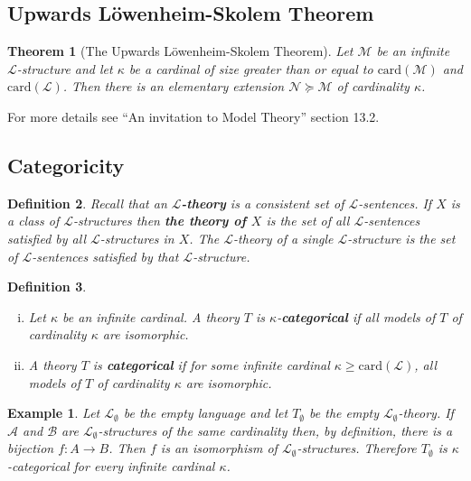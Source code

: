 \documentclass[11pt]{article}
\newtheorem{theorem}{Theorem}[section]
\newtheorem*{example*}{Example}
\newtheorem{definition}[theorem]{Definition}
\newcommand{\mcal}[1]{\mathcal{#1}}
\begin{document}
\subsection{Upwards L\"owenheim-Skolem Theorem}

\begin{theorem}[The Upwards L\"owenheim-Skolem Theorem]
Let $\mcal{M} $ be an infinite $\mcal{L}$-structure and let $\kappa$ be a cardinal of size greater than or equal to $\textrm{card}(\mcal{M})$ and $\textrm{card}(\mcal{L})$.
Then there is an elementary extension $\mcal{N}\succeq \mcal{M}$ of cardinality $\kappa$.
\end{theorem}


For more details see ``An invitation to Model Theory'' section 13.2.

\subsection{Categoricity}

\begin{definition}
Recall that an \textbf{$\mcal{L}$-theory} is a consistent set of $\mcal{L}$-sentences. If $X$ is a class of $\mcal{L}$-structures then \textbf{the theory of $X$} is the set of all $\mcal{L}$-sentences satisfied by all $\mcal{L}$-structures in $X$. The $\mcal{L}$-theory of a single $\mcal{L}$-structure is the set of $\mcal{L}$-sentences satisfied by that $\mcal{L}$-structure.
\end{definition}

\begin{definition}
\begin{enumerate}[(i)]
\item
Let $\kappa$ be an infinite cardinal. A theory $T$ is $\kappa$-\textbf{categorical} if all models of $T$ of cardinality $\kappa$ are isomorphic.
\item
A theory $T$ is \textbf{categorical} if for some infinite cardinal $\kappa\geq \textrm{card}(\mcal{L})$, all models of $T$ of cardinality $\kappa$ are isomorphic.
\end{enumerate}
\end{definition}

\begin{example*}
Let $\mcal{L}_\emptyset$ be the empty language and let $T_\emptyset$ be the empty $\mcal{L}_\emptyset$-theory. If $\mcal{A}$ and $\mcal{B}$ are $\mcal{L}_\emptyset$-structures of the same cardinality then, by definition, there is a bijection $f:A\rightarrow B$. Then $f$ is an isomorphism of $\mcal{L}_\emptyset$-structures. Therefore $T_\emptyset$ is $\kappa$-categorical for every infinite cardinal $\kappa$. 
\end{example*}
\end{document}
